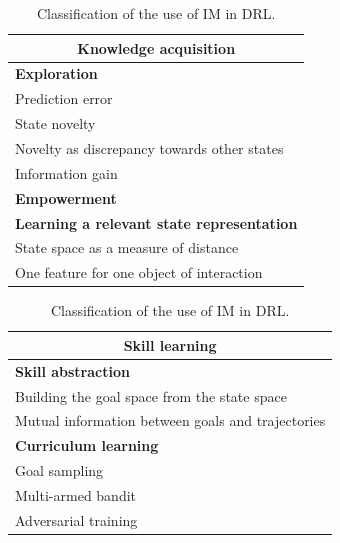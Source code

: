 \documentclass[conference]{IEEEtran}
\begin{document}
\begin{table}[ht]
  \centering
  \begin{subtable}[t]{0.45\columnwidth}
    \centering
    \begin{tabular}{|p{}|}
      \hline
      \multicolumn{1}{|c|}{\textbf{Knowledge acquisition}} \\
      \hline
      \hline
      \textbf{Exploration} \\
      \hline
      Prediction error \\
      State novelty \\
      Novelty as discrepancy towards other states \\
      Information gain \\
      \hline
      \hline
      \textbf{Empowerment} \\
      \hline
      \hline
      \textbf{Learning a relevant state representation} \\
      \hline
      State space as a measure of distance \\
      One feature for one object of interaction \\
      \hline
    \end{tabular}
  \end{subtable}
  \hspace{0em}
  \begin{subtable}[t]{0.45\columnwidth}
    \centering
    \begin{tabular}{|p{}|}
      \hline
      \multicolumn{1}{|c|}{\textbf{Skill learning}} \\
      \hline
      \hline
      \textbf{Skill abstraction} \\
      \hline
      Building the goal space from the state space \\
      Mutual information between goals and trajectories \\
      \hline
      \hline
      \textbf{Curriculum learning} \\
      \hline
      Goal sampling \\
      Multi-armed bandit \\
      Adversarial training \\
      \hline
    \end{tabular}
  \end{subtable}
  \caption{Classification of the use of IM in DRL.}
  \label{tab:classification}
\end{table}
\end{document}
